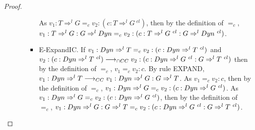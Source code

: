 \documentclass[a4paper]{article}
\begin{document}
\begin{proof}
\begin{itemize}
\begin{itemize}
\begin{itemize}
            As $v_1 : T \Rightarrow^l G =_c v_2 : (c : T \Rightarrow^l G\ ^{cl})$, then by the definition of $=_c$, $v_1 : T \Rightarrow^l G : G \Rightarrow^l \Dyn =_c v_2 : (c : T \Rightarrow^l G\ ^{cl} : G \Rightarrow^l \Dyn\ ^{cl})$.
            \item E-ExpandIC.
            If $v_1 : Dyn \Rightarrow^l T =_c v_2 : (c : Dyn \Rightarrow^l T\ ^{cl})$ and $v_2 : (c : \Dyn \Rightarrow^l T\ ^{cl}) \gios v_2 : (c : \Dyn \Rightarrow^l G\ ^{cl} : G \Rightarrow^l T\ ^{cl})$ then by the definition of $=_c$, $v_1 =_c v_2 : c$.
            By rule EXPAND, $v_1 : Dyn \Rightarrow^l T \longrightarrow_{CC} v_1 : Dyn \Rightarrow^l G : G \Rightarrow^l T$.
            As $v_1 =_c v_2 : c$, then by the definition of $=_c$, $v_1 : \Dyn \Rightarrow^l G =_c v_2 : (c : \Dyn \Rightarrow^l G\ ^{cl})$.
            As $v_1 : \Dyn \Rightarrow^l G =_c v_2 : (c : \Dyn \Rightarrow^l G\ ^{cl})$, then by the definition of $=_c$, $v_1 : \Dyn \Rightarrow^l G : G \Rightarrow^l T =_c v_2 : (c : \Dyn \Rightarrow^l G\ ^{cl} : G \Rightarrow^l T\ ^{cl})$.
        \end{itemize}
    \end{itemize}
\end{itemize}
\end{proof}
\end{document}
